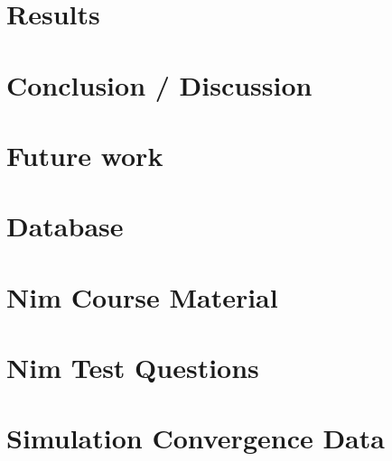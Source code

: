 \documentclass[oneside]{memoir}
\begin{document}
\chapter{Results}
\label{ch:results}

\chapter{Conclusion / Discussion}
\label{ch:discussion_conclusion}

\chapter{Future work}
\label{ch:future_work}






\appendix
\chapter{Database}
\label{ax_database}

\chapter{Nim Course Material}
\label{ax_resources}

\chapter{Nim Test Questions}
\label{ax_questions}

\chapter{Simulation Convergence Data}
\label{ax_simulation_convergence_data}

\end{document}
